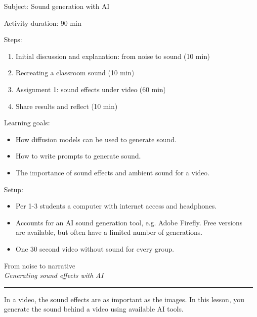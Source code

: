 \documentclass[12pt]{article}
\begin{document}
\vspace*{0.5\textheight}

Subject: Sound generation with AI

Activity duration: 90 min

\vspace{0.5cm}

Steps:
\begin{enumerate}
    \item Initial discussion and explanation: from noise to sound (10 min)
    \item Recreating a classroom sound (10 min)
    \item Assignment 1: sound effects under video (60 min)
    \item Share results and reflect (10 min)
\end{enumerate}

Learning goals:

\begin{itemize}
    \item How diffusion models can be used to generate sound. 
    \item How to write prompts to generate sound. 
    \item The importance of sound effects and ambient sound for a video. 
\end{itemize}

Setup: 
\begin{itemize}
    \item Per 1-3 students a computer with internet access and headphones. 
    \item Accounts for an AI sound generation tool, e.g. Adobe Firefly. Free versions are available, but often have a limited number of generations.  
    \item One 30 second video without sound for every group. 
\end{itemize}

\newpage

\begin{center}
    {\Huge \color{maincolor} From noise to narrative}\\[5pt]
    {\large \textit{Generating sound effects with AI}}\\
    \rule{\linewidth}{1pt}
\end{center}

\vspace{0.5cm}

In a video, the sound effects are as important as the images. In this lesson, you generate the sound behind a video using available AI tools.
\end{document}
